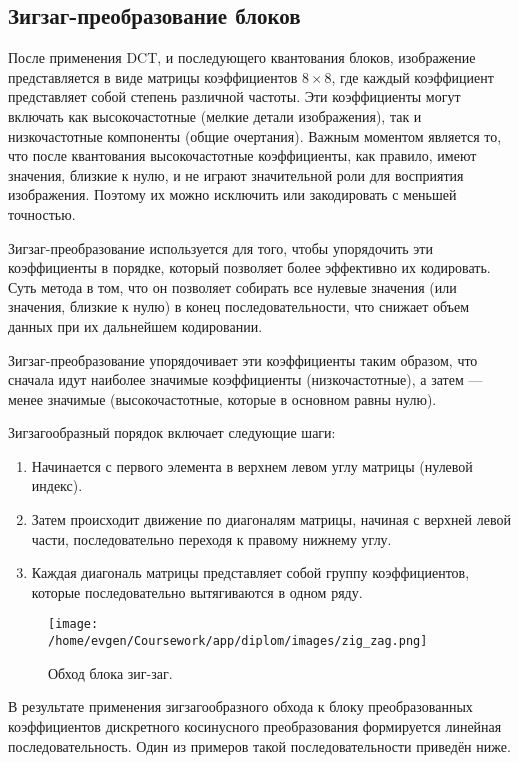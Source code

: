 \subsection{Зигзаг-преобразование блоков}

После применения DCT, и последующего квантования блоков, изображение представляется в виде матрицы коэффициентов $8 \times 8$, 
где каждый коэффициент представляет собой степень различной частоты. 
Эти коэффициенты могут включать как высокочастотные (мелкие детали изображения), так и низкочастотные компоненты (общие очертания). 
Важным моментом является то, что после квантования высокочастотные коэффициенты, как правило, имеют значения, близкие к нулю, 
и не играют значительной роли для восприятия изображения. 
Поэтому их можно исключить или закодировать с меньшей точностью.

Зигзаг-преобразование используется для того, чтобы упорядочить эти коэффициенты в порядке, 
который позволяет более эффективно их кодировать. 
Суть метода в том, что он позволяет собирать все нулевые значения (или значения, близкие к нулю) в конец последовательности, 
что снижает объем данных при их дальнейшем кодировании.

Зигзаг-преобразование упорядочивает эти коэффициенты таким образом, что сначала идут наиболее значимые коэффициенты (низкочастотные), 
а затем — менее значимые (высокочастотные, которые в основном равны нулю).

Зигзагообразный порядок включает следующие шаги:

\begin{enumerate}
    \item Начинается с первого элемента в верхнем левом углу матрицы (нулевой индекс).
    \item Затем происходит движение по диагоналям матрицы, начиная с верхней левой части, последовательно переходя к правому нижнему углу.
    \item Каждая диагональ матрицы представляет собой группу коэффициентов, которые последовательно вытягиваются в одном ряду.
\end{enumerate}


\begin{figure}[h!]
    \centering
    \texttt{[image: /home/evgen/Coursework/app/diplom/images/zig\_zag.png]}
    \caption{Обход блока зиг-заг.}
    \label{fig:zig_zag}
\end{figure}


В результате применения зигзагообразного обхода к блоку преобразованных коэффициентов 
дискретного косинусного преобразования формируется линейная последовательность. Один из примеров такой последовательности приведён ниже.

